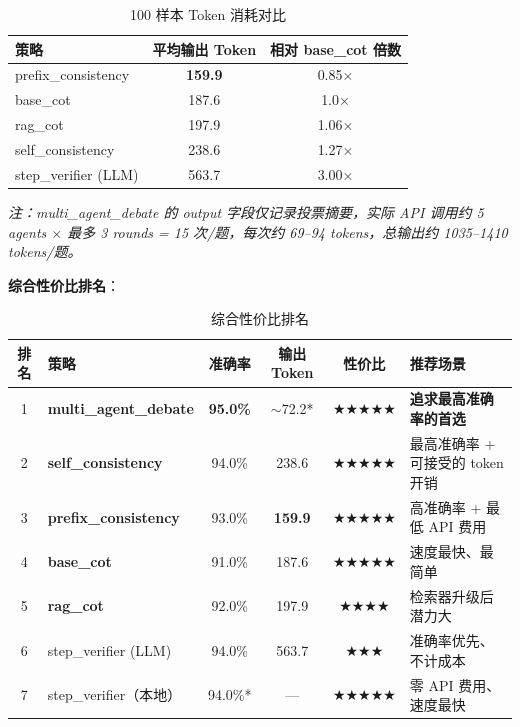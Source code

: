 \documentclass[lang=cn,a4paper,newtx]{elegantpaper}
\begin{document}
\begin{table}[htbp]
\centering
\caption{100 样本 Token 消耗对比}
\begin{tabular}{lcc}
\toprule
策略 & 平均输出 Token & 相对 base\_cot 倍数 \\
\midrule
prefix\_consistency & \textbf{159.9} & 0.85$\times$ \\
base\_cot & 187.6 & 1.0$\times$ \\
rag\_cot & 197.9 & 1.06$\times$ \\
self\_consistency & 238.6 & 1.27$\times$ \\
step\_verifier (LLM) & 563.7 & 3.00$\times$ \\
\bottomrule
\end{tabular}
\end{table}

\textit{注：multi\_agent\_debate 的 output 字段仅记录投票摘要，实际 API 调用约 5 agents $\times$ 最多 3 rounds = 15 次/题，每次约 69--94 tokens，总输出约 1035--1410 tokens/题。}

\textbf{综合性价比排名}：

\begin{table}[htbp]
\centering
\caption{综合性价比排名}
\begin{tabular}{clcccl}
\toprule
排名 & 策略 & 准确率 & 输出 Token & 性价比 & 推荐场景 \\
\midrule
1 & \textbf{multi\_agent\_debate} & \textbf{95.0\%} & $\sim$72.2* & $\bigstar\bigstar\bigstar\bigstar\bigstar$ & \textbf{追求最高准确率的首选} \\
2 & \textbf{self\_consistency} & 94.0\% & 238.6 & $\bigstar\bigstar\bigstar\bigstar\bigstar$ & 最高准确率 + 可接受的 token 开销 \\
3 & \textbf{prefix\_consistency} & 93.0\% & \textbf{159.9} & $\bigstar\bigstar\bigstar\bigstar\bigstar$ & 高准确率 + 最低 API 费用 \\
4 & \textbf{base\_cot} & 91.0\% & 187.6 & $\bigstar\bigstar\bigstar\bigstar\bigstar$ & 速度最快、最简单 \\
5 & \textbf{rag\_cot} & 92.0\% & 197.9 & $\bigstar\bigstar\bigstar\bigstar$ & 检索器升级后潜力大 \\
6 & step\_verifier (LLM) & 94.0\% & 563.7 & $\bigstar\bigstar\bigstar$ & 准确率优先、不计成本 \\
7 & step\_verifier（本地） & 94.0\%* & --- & $\bigstar\bigstar\bigstar\bigstar\bigstar$ & 零 API 费用、速度最快 \\
\bottomrule
\end{tabular}
\end{table}
\end{document}
